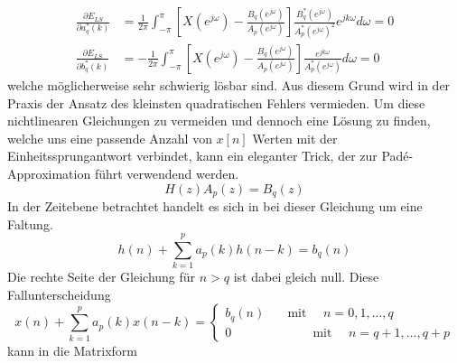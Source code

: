 \begin{align*}
\frac{\partial E_{L S}}{\partial a_{q}^{*}(k)}
&=
\frac{1}{2 \pi} 
\int_{-\pi}^{\pi}
\left[X\left(e^{j \omega}\right)-\frac{B_{q}\left(e^{j \omega}\right)}{A_{p}\left(e^{j \omega}\right)}\right] 
\frac{B_{q}^{*}\left(e^{j \omega}\right)}{A_{p}^{*}\left(e^{j \omega}\right)^{2}} 
e^{j k \omega} d \omega
=
0\\
\frac{\partial E_{L S}}{\partial b_{q}^{*}(k)}
&=
-\frac{1}{2 \pi} 
\int_{-\pi}^{\pi}
\left[X\left(e^{j \omega}\right)-\frac{B_{q}\left(e^{j \omega}\right)}{A_{p}\left(e^{j \omega}\right)}\right] 
\frac{e^{j k \omega}}{A_{p}^{*}\left(e^{j \omega}\right)} d \omega
=
0
\end{align*}
welche möglicherweise sehr schwierig lösbar sind.
Aus diesem Grund wird in der Praxis der Ansatz des kleinsten quadratischen Fehlers vermieden. 
Um diese nichtlinearen Gleichungen zu vermeiden und dennoch eine Lösung zu finden, welche uns eine passende Anzahl von $x[n]$ Werten mit der Einheitssprungantwort verbindet, kann ein eleganter Trick, der zur Padé-Approximation führt verwendend werden. 
\begin{equation}
H(z) A_{p}(z)=B_{q}(z)
\end{equation}
In der Zeitebene betrachtet handelt es sich in bei dieser Gleichung um eine Faltung.
\begin{equation}
h(n)+\sum_{k=1}^{p} a_{p}(k) h(n-k)=b_{q}(n)
\end{equation}
Die rechte Seite der Gleichung für $n>q$ ist dabei gleich null.
Diese Fallunterscheidung
\begin{equation}
x(n)+\sum_{k=1}^{p} a_{p}(k) x(n-k)
=
\left\{\begin{array}{cc}
b_{q}(n) & 
\quad \text{mit } \quad n=0,1, \ldots, q \\
0 & 
\quad \quad \quad\text{mit } \quad n=q+1, \ldots, q+p
\end{array}\right.\end{equation}
kann in die Matrixform 
